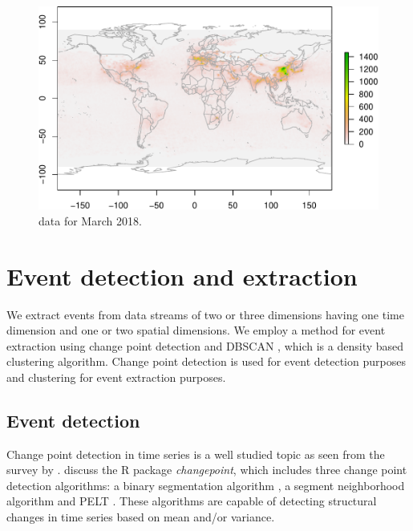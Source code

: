 \documentclass[a4paper,11pt]{article}
\begin{document}
\begin{figure}[!htb]
	\centering
	\includegraphics[scale=0.5]{./Graphics/NO2_March_2018_With_Bndry.pdf}
	\caption{ data for March 2018.}
  \label{fig:NO2March2008}
\end{figure}

\section{Event detection and extraction}\label{sec:EventExtract}

We extract events from data streams of two or three dimensions having one time dimension and one or two spatial dimensions. We employ a method for event extraction using change point detection \citep{killick2014changepoint} and DBSCAN \citep{ester1996density}, which is a density based clustering algorithm. Change point detection is used for event detection purposes and clustering for event extraction purposes.

\subsection{Event detection}\label{subsec:eventdetection}

Change point detection in time series is a well studied topic as seen from the survey by \cite{aminikhanghahi2017survey}. \cite{killick2014changepoint} discuss the R package \textit{changepoint}, which includes three change point detection algorithms: a binary segmentation algorithm \citep{scott1974cluster, sen1975tests}, a segment neighborhood algorithm \citep{auger1989algorithms,bai1998estimating} and PELT \citep{killick2012optimal}. These algorithms are capable of detecting structural changes in time series based on mean and/or variance.
\end{document}

